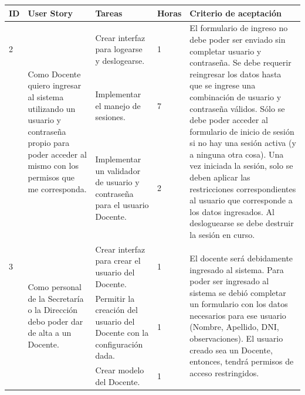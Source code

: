 \documentclass[a4paper, 11pt]{article}
\begin{document}
\begin{table}[H]
\centering
\begin{tabular}{ | p{0.5cm} | p{4cm} | p{5cm} | p{0.85cm} | p{5cm} |}
\hline 
ID & User Story & Tareas & Horas & Criterio de aceptación \\ \hline \hline


2 & \multirow{3}{4cm}{Como Docente quiero ingresar al sistema utilizando un usuario y contraseña propio para poder acceder al mismo con los permisos que me corresponda.} & Crear interfaz para logearse y deslogearse. & 1 & \multirow{3}{5cm}{El formulario de ingreso no debe poder ser enviado sin completar usuario y contraseña. Se debe requerir reingresar los datos hasta que se ingrese una combinación de usuario y contraseña válidos. Sólo se debe poder acceder al formulario de inicio de sesión si no hay una sesión activa (y a ninguna otra cosa). Una vez iniciada la sesión, solo se deben aplicar las restricciones correspondientes al usuario que corresponde a los datos ingresados. Al desloguearse se debe destruir la sesión en curso.} \\[3.4cm] \cline{3-4}
& & Implementar el manejo de sesiones. & 7 & \\[3.4cm] \cline{3-4}
& & Implementar un validador de usuario y contraseña para el usuario Docente. & 2 & \\[3.4cm] \hline


3 & \multirow{3}{4cm}{Como personal de la Secretaría o la Dirección debo poder dar de alta a un Docente.} & Crear interfaz para crear el usuario del Docente. & 1 & \multirow{3}{5cm}{El docente será debidamente ingresado al sistema. Para poder ser ingresado al sistema se debió completar un formulario con los datos necesarios para ese usuario (Nombre, Apellido, DNI, observaciones). El usuario creado sea un Docente, entonces, tendrá permisos de acceso restringidos. } \\[2.5cm] \cline{3-4} 
& & Permitir la creación del usuario del Docente con la configuración dada. & 1 & \\[2.5cm] \cline{3-4}
& & Crear modelo del Docente. & 1 & \\[2.5cm] \hline

\end{tabular}
\end{table}
\end{document}
